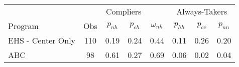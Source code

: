 \begin{tabular}{lccccccc}
\toprule 
\midrule 
\multicolumn{2}{c}{} & \multicolumn{2}{c}{Compliers} &  & \multicolumn{3}{c}{Always-Takers} \\
 \cmidrule(lr){3-4} \cmidrule(lr){6-8} 
Program & Obs & $p_{nh}$ & $p_{ch}$ & $\omega_{nh}$ & $p_{hh}$ & $p_{cc}$ & $p_{nn}$ \\
\midrule 
EHS - Center Only & 110 & 0.19 & 0.24 & 0.44 & 0.11 & 0.26 & 0.20 \\
ABC & 98 & 0.61 & 0.27 & 0.69 & 0.06 & 0.02 & 0.04 \\
\midrule 
\bottomrule 
\end{tabular}
